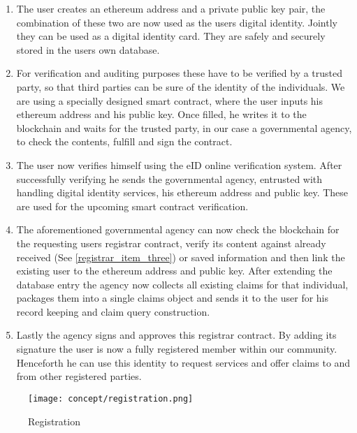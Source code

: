 \begin{enumerate}
\item \label{registrar_item_one}
The user creates an ethereum address and a private public key pair, the combination of these two are now used as the users digital identity. Jointly they can be used as a digital identity card. They are safely and securely stored in the users own database.
\item \label{registrar_item_two}
For verification and auditing purposes these have to be verified by a trusted party, so that third parties can be sure of the identity of the individuals. We are using a specially designed smart contract, where the user inputs his ethereum address and his public key. Once filled, he writes it to the blockchain and waits for the trusted party, in our case a governmental agency, to check the contents, fulfill and sign the contract.
\item \label{registrar_item_three}
The user now verifies himself using the eID online verification system. After successfully verifying he sends the governmental agency, entrusted with handling digital identity services, his ethereum address and public key. These are used for the upcoming smart contract verification.
\begin{comment}
DONT NEED: The user can now have his ethereum address and private public key pair verified by a governmental agency.
\end{comment}
\item \label{registrar_item_four}
The aforementioned governmental agency can now check the blockchain for the requesting users registrar contract, verify its content against already received (See \ref{registrar_item_three}) or saved information and then link the existing user to the ethereum address and public key. After extending the database entry the agency now collects all existing claims for that individual, packages them into a single claims object and sends it to the user for his record keeping and claim query construction.  
\item \label{registrar_item_five}
Lastly the agency signs and approves this registrar contract. By adding its signature the user is now a fully registered member within our community. Henceforth he can use this identity to request services and offer claims to and from other registered parties. 
\end{enumerate}

\begin{figure}[ht]
\centering
\texttt{[image: concept/registration.png]}
\caption{Registration}
\label{fig:registration_concept}
\end{figure}

